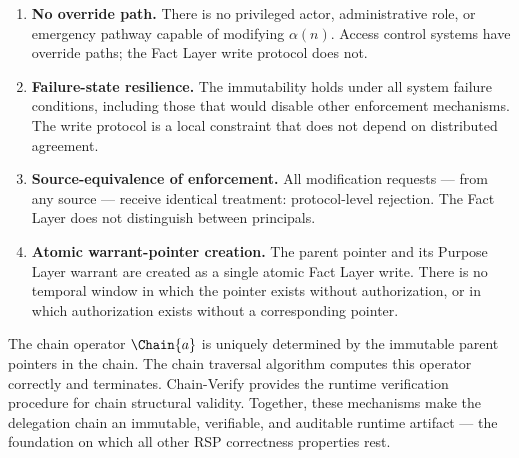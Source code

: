 \begin{enumerate}
    \item[(1)] \textbf{No override path.} There is no privileged actor, administrative role, or emergency pathway capable of modifying $\alpha(n)$. Access control systems have override paths; the Fact Layer write protocol does not.
    \item[(2)] \textbf{Failure-state resilience.} The immutability holds under all system failure conditions, including those that would disable other enforcement mechanisms. The write protocol is a local constraint that does not depend on distributed agreement.
    \item[(3)] \textbf{Source-equivalence of enforcement.} All modification requests --- from any source --- receive identical treatment: protocol-level rejection. The Fact Layer does not distinguish between principals.
    \item[(4)] \textbf{Atomic warrant-pointer creation.} The parent pointer and its Purpose Layer warrant are created as a single atomic Fact Layer write. There is no temporal window in which the pointer exists without authorization, or in which authorization exists without a corresponding pointer.
\end{enumerate}

The chain operator $\Chain{a}$ is uniquely determined by the immutable parent pointers in the chain. The chain traversal algorithm computes this operator correctly and terminates. Chain-Verify provides the runtime verification procedure for chain structural validity. Together, these mechanisms make the delegation chain an immutable, verifiable, and auditable runtime artifact --- the foundation on which all other RSP correctness properties rest.